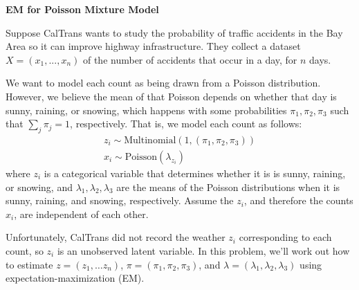 \documentclass[12pt, addpoints]{exam}
\begin{document}
\begin{questions}

 \question[30] \textbf{EM for Poisson Mixture Model}
 
 Suppose CalTrans wants to study the probability of traffic accidents in the Bay Area so it can improve highway infrastructure. They collect a dataset $X = (x_1, ..., x_n)$ of the number of accidents that occur in a day, for $n$ days.
 
 We want to model each count as being drawn from a Poisson distribution. However, we believe the mean of that Poisson depends on whether that day is sunny, raining, or snowing, which happens with some probabilities $\pi_1, \pi_2, \pi_3$ such that $\sum_j \pi_j = 1$, respectively. That is, we model each count as follows:
 \begin{gather*}
     z_i \sim \text{Multinomial}(1, (\pi_1, \pi_2, \pi_3)) \\
     x_i \sim \text{Poisson}(\lambda_{z_i})
 \end{gather*}
 where $z_i$ is a categorical variable that determines whether it is is sunny, raining, or snowing, and $\lambda_1, \lambda_2, \lambda_3$ are the means of the Poisson distributions when it is sunny, raining, and snowing, respectively. Assume the $z_i$, and therefore the counts $x_i$, are independent of each other.
 
 Unfortunately, CalTrans did not record the weather $z_i$ corresponding to each count, so $z_i$ is an unobserved latent variable. In this problem, we'll work out how to estimate $z = (z_1, \ldots z_n)$, $\pi = (\pi_1, \pi_2, \pi_3)$, and $\lambda = (\lambda_1, \lambda_2, \lambda_3)$ using expectation-maximization (EM).
 
\end{questions}
\end{document}
